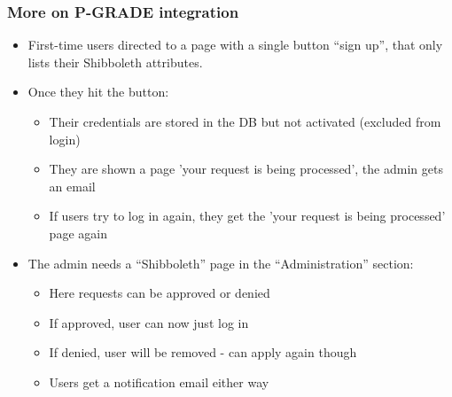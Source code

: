 \documentclass{beamer}
\newcommand{\+}{\vspace{1em}}
\begin{document}
\begin{frame}[label=more-pgrade]
  \frametitle{More on P-GRADE integration}

  \begin{itemize}\item First-time users directed to a page with
    a single button ``sign up'', that only lists their Shibboleth attributes.
  \item Once they hit the button: 
    \begin{itemize}
    \item Their credentials are stored in the DB
      but not activated (excluded from login)
    \item They are shown a page 'your request is being processed', the
      admin gets an email
    \item If users try to log in again, they get the 'your request is
      being processed' page again
    \end{itemize}
  \item The admin needs a ``Shibboleth'' page in the ``Administration''
    section:
    \begin{itemize}
    \item Here requests can be approved or denied
    \item If approved, user can now just log in
    \item If denied, user will be removed - can apply again though
    \item Users get a notification email either way
    \end{itemize}
  \end{itemize}

  \hyperlink{pgrade}{}
\end{frame}
\end{document}
